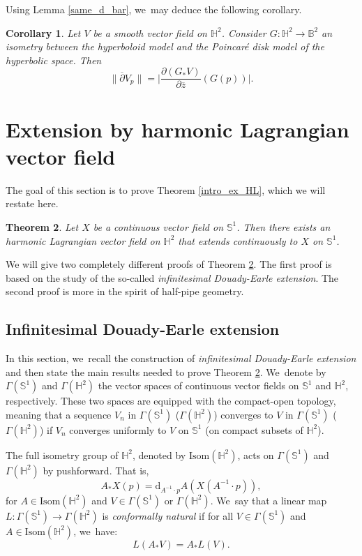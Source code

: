 \documentclass[10pt]{amsart}
\theoremstyle{plain}
\newtheorem{cor}{Corollary}[section]
\newtheorem{theorem}[cor]{Theorem}
\theoremstyle{definition}
\begin{document}
Using Lemma \ref{same_d_bar}, we~may deduce the following corollary.
\begin{cor}\label{d_bar_isometry}
Let \(V \) be a smooth vector field on \(\mathbb{H}^2\). Consider \(G:\mathbb{H}^2 \to \mathbb{B}^2 \) an isometry between the hyperboloid model and the Poincaré disk model of the hyperbolic space. Then
\[
\lVert \overline{\partial} V_p \rVert = \bigg| \frac{\partial (G_*V)}{\partial \overline{z}}(G(p)) \bigg|.
\]
\end{cor}

\section{Extension by harmonic Lagrangian vector field}\label{sec6_extension}
The goal of this section is to prove Theorem \ref{intro_ex_HL}, which we will restate here.
\begin{theorem}\label{THHL_Existence}
Let $X$ be a continuous vector field on $\mathbb{S}^1$. Then there exists an harmonic Lagrangian vector field on $\mathbb{H}^2$ that extends continuously to $X$ on $\mathbb{S}^1$.
\end{theorem}
We will give two completely different proofs of Theorem \ref{THHL_Existence}. The first proof is based on the study of the so-called \emph{infinitesimal Douady-Earle extension}. The second proof is more in the spirit of half-pipe geometry.

\subsection{Infinitesimal Douady-Earle extension}\label{subsec_inf_DEE}
In this section, we~recall the construction of \emph{infinitesimal Douady-Earle extension} and then state the main results needed to prove Theorem \ref{THHL_Existence}. We~denote by $\Gamma(\mathbb{S}^1)$ and $\Gamma(\mathbb{H}^2)$ the vector spaces of continuous vector fields on $\mathbb{S}^1$ and $\mathbb{H}^2$, respectively. These two spaces are equipped with the compact-open topology, meaning that a sequence $V_n$ in $\Gamma(\mathbb{S}^1)$ (\resp $\Gamma(\mathbb{H}^2)$) converges to $V$ in $\Gamma(\mathbb{S}^1)$ (\resp $\Gamma(\mathbb{H}^2)$) if $V_n$ converges uniformly to $V$ on $\mathbb{S}^1$ (\resp on compact subsets of $\mathbb{H}^2$).

The full isometry group of $\mathbb{H}^2$, denoted by $\mathrm{Isom}(\mathbb{H}^2)$, acts on $\Gamma(\mathbb{S}^1)$ and $\Gamma(\mathbb{H}^2)$ by pushforward. That is,
\[
A_* X(p)=\mathrm{d}_{A^{-1}\cdot p}A(X(A^{-1}\cdot p)),
\]
for $A \in \mathrm{Isom}(\mathbb{H}^2)$ and $V \in \Gamma(\mathbb{S}^1)$ or $\Gamma(\mathbb{H}^2)$. We~say that a linear map $L:\Gamma(\mathbb{S}^1) \to \Gamma(\mathbb{H}^2)$ is \emph{conformally natural} if for all $V \in \Gamma(\mathbb{S}^1)$ and $A \in \mathrm{Isom}(\mathbb{H}^2)$, we~have:
\[
L(A_*V)=A_*L(V).
\]
\end{document}
